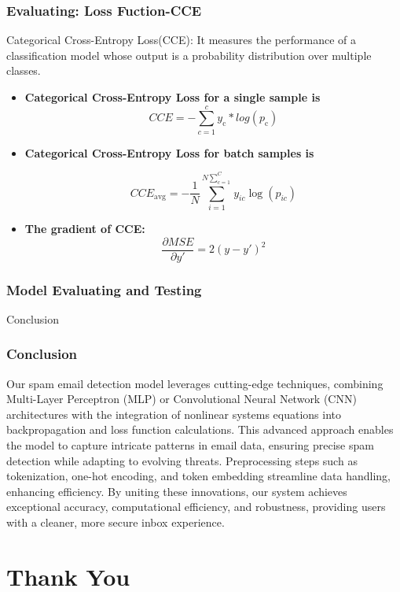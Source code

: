 \documentclass[aspectratio=1610]{beamer}
\begin{document}
\begin{frame}
    \frametitle{Evaluating: Loss Fuction-CCE}
    Categorical Cross-Entropy Loss(CCE): It measures the performance of a classification 
    model whose output is a probability distribution over multiple classes. 
    \vspace{0.5cm}

    \begin{itemize}

        \item  \textbf{Categorical Cross-Entropy Loss for a single sample is} 
        \[
            CCE = - \sum_{c=1}^{c} y_\text{c} * log(p_\text{c})
        \]

        \item \textbf{Categorical Cross-Entropy Loss for batch samples is }
        
\[
CCE_{\text{avg}} = - \frac{1}{N} \sum_{i=1}^{N\sum_{c=1}^{C}}  y_{ic} \log(p_{ic})
\]
        
        \item \textbf{The gradient of CCE:}
       \[
       \frac{\partial MSE}{\partial y'} =  2(y-y')^2
       \]
    \end{itemize}


\end{frame}

\begin{frame}
    \frametitle{Model Evaluating and Testing}

\end{frame}



\begin{frame}{Conclusion}
    \frametitle{Conclusion}
    Our spam email detection model leverages cutting-edge techniques, 
    combining Multi-Layer Perceptron (MLP) or 
    Convolutional Neural Network (CNN) 
    architectures with the integration of nonlinear systems equations into backpropagation 
    and loss function calculations. This advanced approach enables the model to capture intricate patterns in email data, ensuring precise spam detection while adapting to evolving threats. Preprocessing steps such as tokenization, one-hot encoding, and token embedding streamline data handling, enhancing efficiency. By uniting these innovations, our system achieves exceptional accuracy, computational efficiency, and robustness, providing users with a cleaner, more secure inbox experience.
    
\end{frame}

\section{Thank You}
\end{document}
